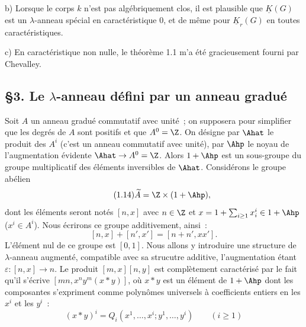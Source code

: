 b)
Lorsque le corps $k$ n'est pas algébriquement clos, il est plausible que $\underline{K}(G)$ est un $\lambda$-anneau spécial en caractéristique $0$, et de même pour $\underline{K}_r(G)$ en toutes caractéristiques.

c) En caractéristique non nulle, le théorème 1.1 m'a été gracieusement fourni par Chevalley.

\subsection*{\S 3. Le $\lambda$-anneau défini par un anneau gradué}

Soit $A$ un anneau gradué commutatif avec unité~; on supposera pour simplifier que les degrés de $A$ sont positifs et que $A^0=\Z$. On désigne par $\Ahat$ le produit des $A^i$ (c'est un anneau commutatif avec unité), par $\Ahp$ le noyau de l'augmentation évidente $\Ahat\to A^0=\Z$. Alors $1+\Ahp$ est un sous-groupe du groupe multiplicatif des éléments inversibles de $\Ahat$. Considérons le groupe abélien
\begin{equation}\tag{1.14}
\widetilde A=\Z\times(1+\Ahp),
\end{equation}
dont les éléments seront notés $[n,x]$ avec $n\in\Z$ et $x=1+\sum_{i\geq 1}x^i_i\in1+\Ahp$ ($x^i\in A^i$). Nous écrirons ce groupe additivement, ainsi~:
\begin{equation}\tag{1.15}
[n,x]+[n',x']=[n+n',xx'].
\end{equation}
L'élément nul de ce groupe est $[0,1]$. Nous allons y introduire une structure de $\lambda$-anneau augmenté, compatible avec sa strucutre additive, l'augmentation étant $\varepsilon:[n,x]\longrightarrow n$. Le produit $[m,x][n,y]$ est complètement caractérisé par le fait qu'il s'écrive $[mn,x^n y^m(x*y)]$, où $x*y$ est un élément de $1+\Ahp$ dont les composantes s'expriment comme polynômes universels à coefficients entiers en les $x^i$ et les $y^i$~:
\begin{equation}\tag{1.16}
(x*y)^i=Q_i(x^1,\ldots,x^i;y^1,\ldots,y^i)\qquad (i\geq1)
\end{equation}
